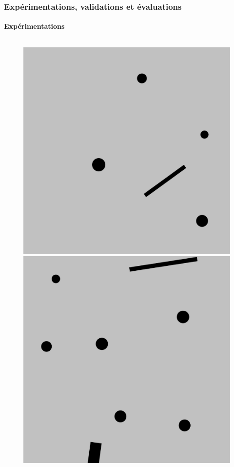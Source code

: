\documentclass{beamer}
\begin{document}
			\begin{frame}
				\frametitle{Expérimentations, validations et évaluations}
				\framesubtitle{Expérimentations}
				\begin{figure}[H]
					\centering
					\begin{columns}
						\begin{column}{0.14\textwidth}
							\includegraphics[width=1\linewidth]{graphics/test_model_05_1.png}
							\includegraphics[width=1\linewidth]{graphics/test_model_08_1.png}

\end{column}
\end{columns}
\end{figure}
\end{frame}
\end{document}
